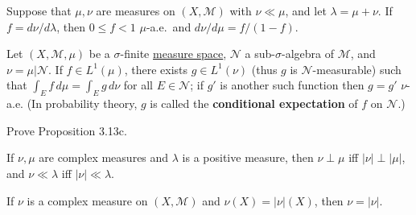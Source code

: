 	\begin{exercise}[Folland 3.16]
		Suppose that $\mu, \nu$ are measures on $(X, \mathcal{M})$ with $\nu \ll \mu$, and let $\lambda = \mu + \nu$. If $f = d\nu/d\lambda$, then $0 \le f < 1$ $\mu$-a.e.\ and $d\nu/d\mu = f/(1 - f)$.
	\end{exercise}
	\begin{solution}

	\end{solution}

	\begin{exercise}[Folland 3.17]
		Let $(X, \mathcal{M}, \mu)$ be a $\sigma$-finite \hyperref[def:measure-space]{measure space}, $\mathcal{N}$ a sub-$\sigma$-algebra of $\mathcal{M}$, and $\nu = \mu|\mathcal{N}$. If $f \in L^1(\mu)$, there exists $g \in L^1(\nu)$ (thus $g$ is $\mathcal{N}$-measurable) such that $\int_E f \, d\mu = \int_E g \, d\nu$ for all $E \in \mathcal{N}$; if $g'$ is another such function then $g = g'$ $\nu$-a.e. (In probability theory, $g$ is called the \textbf{conditional expectation} of $f$ on $\mathcal{N}$.)
	\end{exercise}
	\begin{solution}

	\end{solution}

	\begin{exercise}[Folland 3.18]
		Prove Proposition 3.13c.
	\end{exercise}
	\begin{solution}

	\end{solution}

	\begin{exercise}[Folland 3.19]
		If $\nu, \mu$ are complex measures and $\lambda$ is a positive measure, then $\nu \perp \mu$ iff $|\nu| \perp |\mu|$, and $\nu \ll \lambda$ iff $|\nu| \ll \lambda$.
	\end{exercise}
	\begin{solution}

	\end{solution}

	\begin{exercise}[Folland 3.20]
		If $\nu$ is a complex measure on $(X, \mathcal{M})$ and $\nu(X) = |\nu|(X)$, then $\nu = |\nu|$.
	\end{exercise}
	\begin{solution}

	\end{solution}

